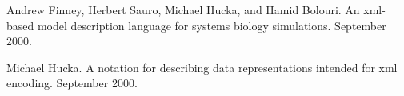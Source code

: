 \documentclass[10pt]{article}
\begin{document}
\begin{thebibliography}{10}
Andrew Finney, Herbert Sauro, Michael Hucka, and Hamid Bolouri.
\newblock An xml-based model description language for systems biology simulations.
\newblock September 2000.

Michael Hucka.  
\newblock A notation for describing data representations intended for xml encoding.
\newblock September 2000.

\end{thebibliography}



\end{document}
